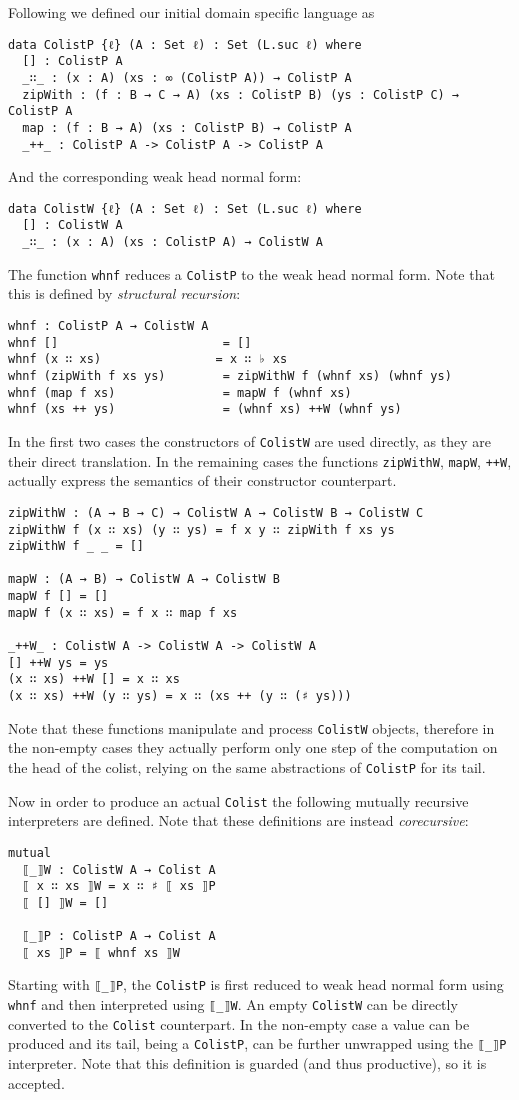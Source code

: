 \documentclass[10pt,a4paper]{article}
\begin{document}
Following \cite{DAN10} we defined our initial domain specific language as
\begin{verbatim}
data ColistP {ℓ} (A : Set ℓ) : Set (L.suc ℓ) where
  [] : ColistP A
  _∷_ : (x : A) (xs : ∞ (ColistP A)) → ColistP A
  zipWith : (f : B → C → A) (xs : ColistP B) (ys : ColistP C) → ColistP A
  map : (f : B → A) (xs : ColistP B) → ColistP A
  _++_ : ColistP A -> ColistP A -> ColistP A
\end{verbatim}	
And the corresponding weak head normal form:
\begin{verbatim}
data ColistW {ℓ} (A : Set ℓ) : Set (L.suc ℓ) where
  [] : ColistW A
  _∷_ : (x : A) (xs : ColistP A) → ColistW A
\end{verbatim}
The function \texttt{whnf} reduces a \texttt{ColistP} to the weak head normal form. Note that this is defined by \emph{structural recursion}:
\begin{verbatim}
whnf : ColistP A → ColistW A
whnf []                       = [] 
whnf (x ∷ xs)                = x ∷ ♭ xs
whnf (zipWith f xs ys)        = zipWithW f (whnf xs) (whnf ys)
whnf (map f xs)               = mapW f (whnf xs)
whnf (xs ++ ys)               = (whnf xs) ++W (whnf ys)
\end{verbatim}
In the first two cases the constructors of \texttt{ColistW} are used directly, as they are their direct translation.
In the remaining cases the functions \texttt{zipWithW}, \texttt{mapW}, \texttt{++W}, actually express the semantics of their constructor counterpart.
\begin{verbatim}
zipWithW : (A → B → C) → ColistW A → ColistW B → ColistW C
zipWithW f (x ∷ xs) (y ∷ ys) = f x y ∷ zipWith f xs ys
zipWithW f _ _ = []

mapW : (A → B) → ColistW A → ColistW B
mapW f [] = []
mapW f (x ∷ xs) = f x ∷ map f xs

_++W_ : ColistW A -> ColistW A -> ColistW A
[] ++W ys = ys
(x ∷ xs) ++W [] = x ∷ xs
(x ∷ xs) ++W (y ∷ ys) = x ∷ (xs ++ (y ∷ (♯ ys)))
\end{verbatim}
Note that these functions manipulate and process \texttt{ColistW} objects, therefore in the non-empty cases they actually perform only one step of the computation on the head of the colist, 
relying on the same abstractions of \texttt{ColistP} for its tail.
 
Now in order to produce an actual \texttt{Colist} the following mutually recursive interpreters are defined. Note that these definitions are instead \emph{corecursive}:
\begin{verbatim}
mutual
  ⟦_⟧W : ColistW A → Colist A
  ⟦ x ∷ xs ⟧W = x ∷ ♯ ⟦ xs ⟧P
  ⟦ [] ⟧W = []

  ⟦_⟧P : ColistP A → Colist A
  ⟦ xs ⟧P = ⟦ whnf xs ⟧W
\end{verbatim}
Starting with \texttt{⟦\_⟧P}, the \texttt{ColistP} is first reduced to weak head normal form using \texttt{whnf} and then interpreted using \texttt{⟦\_⟧W}.
An empty \texttt{ColistW} can be directly converted to the \texttt{Colist} counterpart. In the non-empty case a value can be produced and its tail,
being a \texttt{ColistP}, can be further unwrapped using the \texttt{⟦\_⟧P} interpreter. Note that this definition is guarded (and thus productive), so it is accepted.
\end{document}
